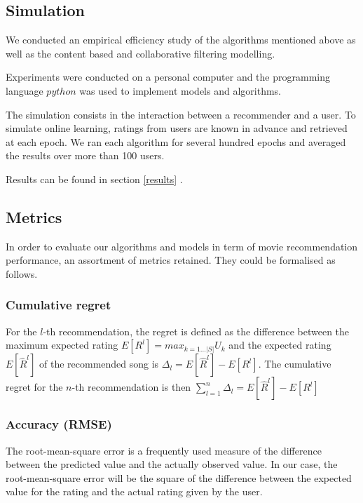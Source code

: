 \documentclass[letterpaper]{article}
\begin{document}
\subsection{Simulation}

We conducted an empirical efficiency study of the algorithms mentioned above as well as the content based and collaborative filtering modelling.

Experiments were conducted on a personal computer and the programming language $python$ was used to implement models and algorithms.

The simulation consists in the interaction between a recommender and a user. To simulate online learning, ratings from users are known in advance and retrieved at each epoch. 
We ran each algorithm for several hundred epochs and averaged the results over more than 100 users. 

Results can be found in section \ref{results} .

\subsection{Metrics} \label{metrics}

In order to evaluate our algorithms and models in term of movie recommendation performance, an assortment of metrics retained. They could be formalised as follows.

\subsubsection{Cumulative regret}

For the $l$-th recommendation, the regret is defined as the difference between the maximum expected rating $ E[R^{l}] = max_{k=1...|S|} U_{k} $  and the expected rating $E[\hat R^{l}]$ of the recommended song is  $\Delta_{l} = E[\hat{R} ^{l}] - E[R^{l}]$. The cumulative regret for the $n$-th recommendation is then $ \sum_{l=1}^{n} \Delta_{l} = E[\hat{R} ^{l}] - E[R^{l}]$

\subsubsection{Accuracy (RMSE)}

The root-mean-square error is a frequently used measure of the difference between the predicted value and the actually observed value. In our case, the root-mean-square error will be the square of the difference between the expected value for the rating and the actual rating given by the user.
\end{document}
